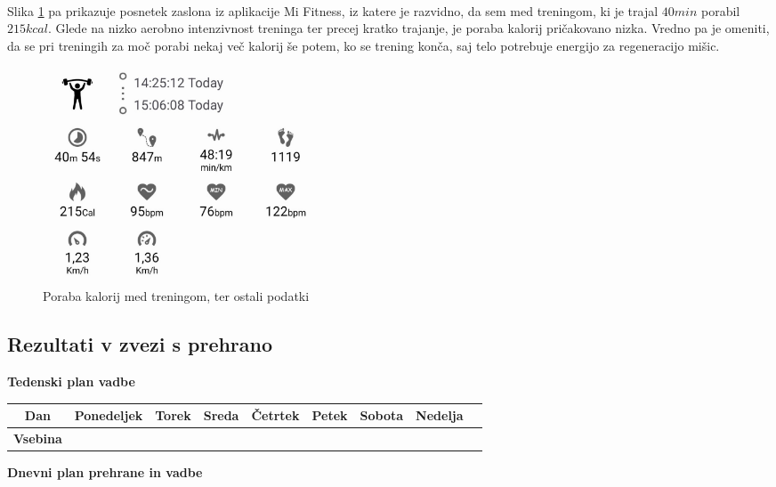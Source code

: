 \documentclass{article}
\begin{document}
\paragraph{}
Slika \ref{fig:poraba-kalorij} pa prikazuje posnetek zaslona iz aplikacije Mi Fitness, iz katere je razvidno, da sem med treningom, ki je trajal $40 min$ porabil $215 kcal$. Glede na nizko aerobno intenzivnost treninga ter precej kratko trajanje, je poraba kalorij pričakovano nizka. Vredno pa je omeniti, da se pri treningih za moč porabi nekaj več kalorij še potem, ko se trening konča, saj telo potrebuje energijo za regeneracijo mišic.

\begin{figure}[H]
    \centering
    \includegraphics[width=0.4\textwidth]{figures/poraba-kalorij.jpg}
    \caption{Poraba kalorij med treningom, ter ostali podatki} 
    \label{fig:poraba-kalorij}
\end{figure}

\subsection{Rezultati v zvezi s prehrano}

\begin{center}
  \textbf{\Large Tedenski plan vadbe}
\end{center}

\vspace{0.5cm}

\begin{tabularx}{\textwidth}{|c|X|X|X|X|X|X|X|X|}
  \hline
  \textbf{Dan} & Ponedeljek & Torek & Sreda & Četrtek & Petek & Sobota & Nedelja \\
  \hline
  \textbf{Vsebina} & & & & & & & & \\
  \hline
\end{tabularx}

\vspace{1cm}

\textbf{\Large Dnevni plan prehrane in vadbe}

\vspace{0.5cm}
\end{document}
